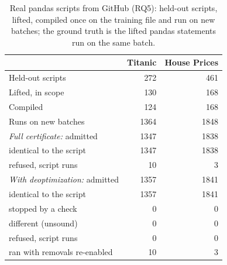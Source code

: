 \begin{table}[t]
\caption{Real pandas scripts from GitHub (RQ5): held-out scripts, lifted, compiled once on the training file and run on new batches; the ground truth is the lifted pandas statements run on the same batch.}
\label{tab:rq-corpus}
\centering
\footnotesize
\begin{tabular}{@{}lrr@{}}
\toprule
& Titanic & House Prices \\
\midrule
Held-out scripts & 272 & 461 \\
Lifted, in scope & 130 & 168 \\
Compiled & 124 & 168 \\
Runs on new batches & 1364 & 1848 \\
\emph{Full certificate:} admitted & 1347 & 1838 \\
\quad identical to the script & 1347 & 1838 \\
\quad refused, script runs & 10 & 3 \\
\emph{With deoptimization:} admitted & 1357 & 1841 \\
\quad identical to the script & 1357 & 1841 \\
\quad stopped by a check & 0 & 0 \\
\quad different (unsound) & 0 & 0 \\
\quad refused, script runs & 0 & 0 \\
\quad ran with removals re-enabled & 10 & 3 \\
\bottomrule
\end{tabular}
\end{table}
